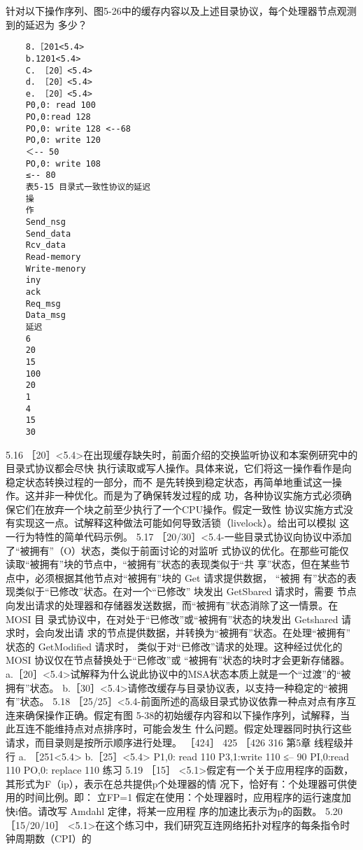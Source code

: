 针对以下操作序列、图5-26中的缓存内容以及上述目录协议，每个处理器节点观测到的延迟为
多少？
\begin{verbatim}
    8.［201<5.4>
    b.1201<5.4>
    C. ［20］<5.4>
    d. ［20］<5.4>
    e. ［20］<5.4>
    P0,0: read 100
    PO,0:read 128
    PO,0: write 128 <--68
    PO,0: write 120
    ＜-- 50
    PO,0: write 108
    ≤-- 80
    表5-15 目录式一致性协议的延迟
    操
    作
    Send_nsg
    Send_data
    Rcv_data
    Read-memory
    Write-menory
    iny
    ack
    Req_msg
    Data_msg
    延迟
    6
    20
    15
    100
    20
    1
    4
    15
    30
\end{verbatim}
5.16 ［20］<5.4>在出现缓存缺失时，前面介绍的交换监听协议和本案例研究中的目录式协议都会尽快
执行读取或写人操作。具体来说，它们将这一操作看作是向稳定状态转换过程的一部分，而不
是先转换到稳定状态，再简单地重试这一操作。这并非一种优化。而是为了确保转发过程的成
功，各种协议实施方式必须确保它们在放弃一个块之前至少执行了一个CPU操作。假定一致性
协议实施方式没有实现这一点。试解释这种做法可能如何导致活锁（livelock）。给出可以模拟
这一行为特性的简单代码示例。
5.17 ［20/30］<5.4-一些目录式协议向协议中添加了“被拥有”（O）状态，类似于前面讨论的对监听
式协议的优化。在那些可能仅读取“被拥有”块的节点中，“被拥有”状态的表现类似于“共
享”状态，但在某些节点中，必须根据其他节点对“被拥有”块的 Get 请求提供数据，
“被拥
有”状态的表现类似于“已修改”状态。在对一个“已修改” 块发出 GetSbared 请求时，需要
节点向发出请求的处理器和存储器发送数据，而“被拥有”状态消除了这一情景。在 MOSI 目
录式协议中，在对处于“已修改”或“被拥有”状态的块发出 Getshared 请求时，会向发出请
求的节点提供数据，并转换为“被拥有”状态。在处理“被拥有” 状态的 GetModified 请求时，
类似于对“已修改”请求的处理。这种经过优化的 MOSI 协议仅在节点替换处于“已修改”或
“被拥有”状态的块时才会更新存储器。
a.［20］<5.4>试解释为什么说此协议中的MSA状态本质上就是一个“过渡”的“被拥有”状态。
b.［30］<5.4>请修改缓存与目录协议表，以支持一种稳定的“被拥有”状态。
5.18
［25/25］<5.4-前面所述的高级目录式协议依靠一种点对点有序互连来确保操作正确。假定有图
5-38的初始缓存内容和以下操作序列，试解释，当此互连不能维持点对点排序时，可能会发生
什么问题。假定处理器同时执行这些请求，而目录则是按所示顺序进行处理。
［424］
425
［426
316
第5章 线程级并行
a. ［251<5.4>
b.［25］<5.4>
P1,0: read 110
P3,1:write 110 ≤-- 90
PI,0:read 110
PO,0: replace 110
练习
5.19 ［15］ <5.1>假定有一个关于应用程序的函数，其形式为F（ip），表示在总共提供p个处理器的情
况下，恰好有：个处理器可供使用的时间比例。即：
立FP=1
假定在使用：个处理器时，应用程序的运行速度加快i倍。请改写 Amdahl 定律，将某一应用程
序的加速比表示为p的函数。
5.20 ［15/20/10］ <5.1>在这个练习中，我们研究互连网络拓扑对程序的每条指令时钟周期数（CPI）的
